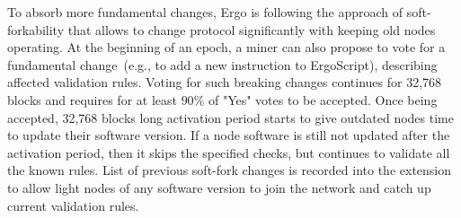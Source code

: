 To absorb more fundamental changes, Ergo is following the approach of soft-forkability that
allows to change protocol significantly with keeping old nodes operating.
At the beginning of an epoch, a miner can also propose to vote for a fundamental change~(e.g., to add a new instruction to ErgoScript), describing affected validation rules.
Voting for such breaking changes continues for 32,768 blocks and requires for at least $90\%$ of
"Yes" votes to be accepted.
Once being accepted, 32,768 blocks long activation period starts to give outdated
nodes time to update their software version.
If a node software is still not updated after the activation period, then it skips the specified checks, but continues
to validate all the known rules.
List of previous soft-fork changes is recorded into the extension to allow light nodes of
any software version to join the network and catch up current validation rules.